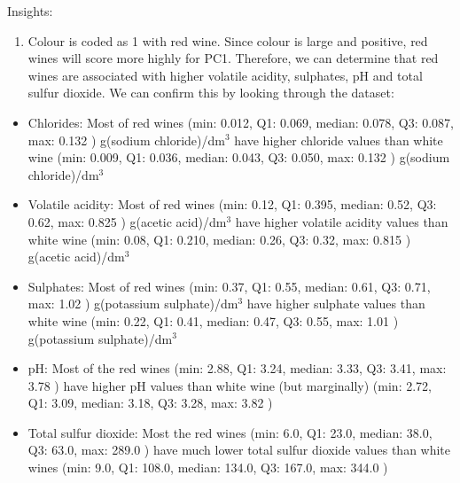 \documentclass[
]{article}
\providecommand{\tightlist}{%
  \setlength{\itemsep}{0pt}\setlength{\parskip}{0pt}}
\begin{document}
Insights:

\begin{enumerate}
\def\labelenumi{\arabic{enumi}.}
\tightlist
\item
  Colour is coded as 1 with red wine. Since colour is large and
  positive, red wines will score more highly for PC1. Therefore, we can
  determine that red wines are associated with higher volatile acidity,
  sulphates, pH and total sulfur dioxide. We can confirm this by looking
  through the dataset:
\end{enumerate}

\begin{itemize}
\tightlist
\item
  Chlorides: Most of red wines (min: 0.012, Q1: 0.069, median: 0.078,
  Q3: 0.087, max: 0.132 ) g(sodium chloride)/dm\(^3\) have higher
  chloride values than white wine (min: 0.009, Q1: 0.036, median: 0.043,
  Q3: 0.050, max: 0.132 ) g(sodium chloride)/dm\(^3\)
\item
  Volatile acidity: Most of red wines (min: 0.12, Q1: 0.395, median:
  0.52, Q3: 0.62, max: 0.825 ) g(acetic acid)/dm\(^3\) have higher
  volatile acidity values than white wine (min: 0.08, Q1: 0.210, median:
  0.26, Q3: 0.32, max: 0.815 ) g(acetic acid)/dm\(^3\)
\item
  Sulphates: Most of red wines (min: 0.37, Q1: 0.55, median: 0.61, Q3:
  0.71, max: 1.02 ) g(potassium sulphate)/dm\(^3\) have higher sulphate
  values than white wine (min: 0.22, Q1: 0.41, median: 0.47, Q3: 0.55,
  max: 1.01 ) g(potassium sulphate)/dm\(^3\)
\item
  pH: Most of the red wines (min: 2.88, Q1: 3.24, median: 3.33, Q3:
  3.41, max: 3.78 ) have higher pH values than white wine (but
  marginally) (min: 2.72, Q1: 3.09, median: 3.18, Q3: 3.28, max: 3.82 )
\item
  Total sulfur dioxide: Most the red wines (min: 6.0, Q1: 23.0, median:
  38.0, Q3: 63.0, max: 289.0 ) have much lower total sulfur dioxide
  values than white wines (min: 9.0, Q1: 108.0, median: 134.0, Q3:
  167.0, max: 344.0 )
\end{itemize}
\end{document}
